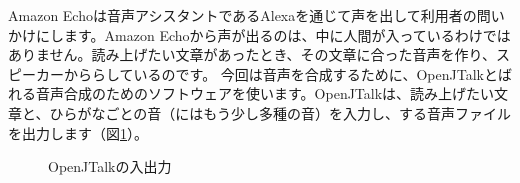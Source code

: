 Amazon Echoは音声アシスタントであるAlexaを通じて声を出して利用者の問いかけにします。Amazon Echoから声が出るのは、中に人間が入っているわけではありません。読み上げたい文章があったとき、その文章に合った音声を作り、スピーカーかららしているのです。
今回は音声を合成するために、OpenJTalkとばれる音声合成のためのソフトウェアを使います。OpenJTalkは、読み上げたい文章と、ひらがなごとの音（にはもう少し多種の音）を入力し、する音声ファイルを出力します（図\ref{OpenJTalkの入出力}）。

\begin{figure}[H]
\begin{center}
    
    \caption{OpenJTalkの入出力}
    \label{OpenJTalkの入出力}
\end{center}
\end{figure}

\begin{tcolorbox}[title=\useOmetoi]
\begin{enumerate}
\end{enumerate}
\end{tcolorbox}
